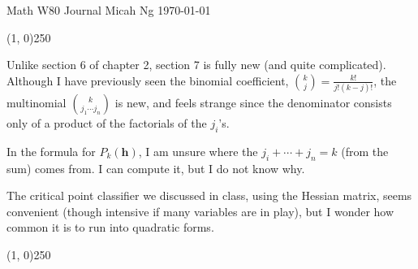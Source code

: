 \documentclass[11pt,letterpaper]{article}
\begin{document}
\noindent
Math W80 Journal \hfill Micah Ng \hfill \today

\begin{center}
\line(1, 0){250}
\end{center}

Unlike section 6 of chapter 2, section 7 is fully new (and quite complicated).
Although I have previously seen the binomial coefficient,
${k\choose j}=\frac{k!}{j!(k-j)!}$, the multinomial $k\choose j_1\cdots j_n$ is
new, and feels strange since the denominator consists only of a product of the
factorials of the $j_i$'s.

In the formula for $P_k(\mathbf{h})$, I am unsure where the $j_i+\cdots+j_n=k$
(from the sum) comes from. I can compute it, but I do not know why.

The critical point classifier we discussed in class, using the Hessian matrix,
seems convenient (though intensive if many variables are in play), but I wonder
how common it is to run into quadratic forms.

\begin{center}
\line(1, 0){250}
\end{center}
\end{document}
